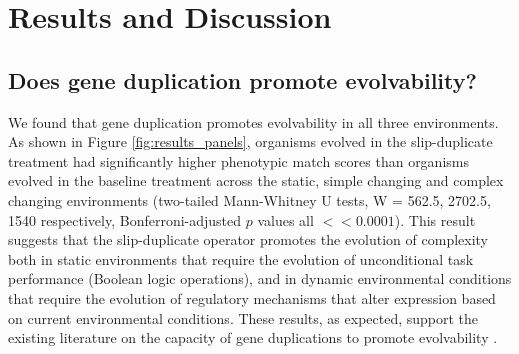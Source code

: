 \section{Results and Discussion} \label{sec:results}

%
%
%
%

\subsection{Does gene duplication promote evolvability?}
We found that gene duplication promotes evolvability in all three environments. As shown in Figure \ref{fig:results_panels}, organisms evolved in the slip-duplicate treatment had significantly higher phenotypic match scores than organisms evolved in the baseline treatment across the static, simple changing and complex changing environments (two-tailed Mann-Whitney U tests, W = 562.5, 2702.5, 1540 respectively, Bonferroni-adjusted $p$ values all $<< 0.0001$). This result suggests that the slip-duplicate operator promotes the evolution of complexity
both in static environments that require the evolution %
of unconditional task performance (Boolean logic operations), and in dynamic environmental conditions that require the evolution of regulatory mechanisms that alter expression based on current environmental conditions.
These results, as expected, support the existing literature on the capacity of gene duplications to promote evolvability %
\citep{Koza:1995fr,Zhang:2003fw,Teichmann:2004cz}. %


